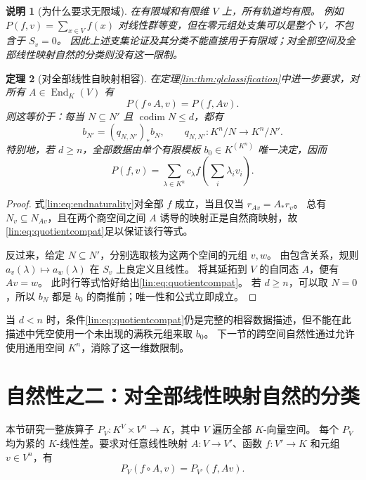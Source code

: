 \documentclass[11pt,a4paper,oneside,openany]{book}
\theoremstyle{lecture}
\newtheorem{theorem}{定理}[section]
\newtheorem{remark}[theorem]{说明}
\newcommand{\End}{\operatorname{End}}
\numberwithin{equation}{section}
\begin{document}
\begin{remark}[为什么要求无限域]
在有限域和有限维 $V$ 上，所有轨道均有限。
例如 $P(f,v)=\sum_{x\in V}f(x)$ 对线性群等变，但在零元组处支集可以是整个 $V$，不包含于 $S_v=0$。
因此上述支集论证及其分类不能直接用于有限域；对全部空间及全部线性映射自然的分类则没有这一限制。
\end{remark}

\begin{theorem}[对全部线性自映射相容]\label{lin:thm:endclassification}
在定理\ref{lin:thm:glclassification}中进一步要求，对所有 $A\in\End_K(V)$ 有
\begin{equation}\label{lin:eq:endnaturality}
 P(f\circ A,v)=P(f,Av).
\end{equation}
则这等价于：每当 $N\subseteq N'$ 且 $\operatorname{codim}N\le d$，都有
\begin{equation}\label{lin:eq:quotientcompat}
 b_{N'}=(q_{N,N'})_*b_N,
 \qquad q_{N,N'}:K^n/N\to K^n/N'.
\end{equation}
特别地，若 $d\ge n$，全部数据由单个有限模板 $b_0\in K^{(K^n)}$ 唯一决定，因而
\[
 P(f,v)=\sum_{\lambda\in K^n}c_\lambda f\left(\sum_i\lambda_iv_i\right).
\]
\end{theorem}
\begin{proof}
式\eqref{lin:eq:endnaturality}对全部 $f$ 成立，当且仅当 $r_{Av}=A_*r_v$。
总有 $N_v\subseteq N_{Av}$，且在两个商空间之间 $A$ 诱导的映射正是自然商映射，故\eqref{lin:eq:quotientcompat}足以保证该行等式。

反过来，给定 $N\subseteq N'$，分别选取核为这两个空间的元组 $v,w$。
由包含关系，规则 $a_v(\lambda)\mapsto a_w(\lambda)$ 在 $S_v$ 上良定义且线性。
将其延拓到 $V$ 的自同态 $A$，便有 $Av=w$。
此时行等式恰好给出\eqref{lin:eq:quotientcompat}。
若 $d\ge n$，可以取 $N=0$，所以 $b_N$ 都是 $b_0$ 的商推前；唯一性和公式立即成立。
\end{proof}

当 $d<n$ 时，条件\eqref{lin:eq:quotientcompat}仍是完整的相容数据描述，但不能在此描述中凭空使用一个未出现的满秩元组来取 $b_0$。
下一节的跨空间自然性通过允许使用通用空间 $K^n$，消除了这一维数限制。

\section{自然性之二：对全部线性映射自然的分类}\label{lin:sec:universal}
本节研究一整族算子 $P_V:K^V\times V^n\to K$，其中 $V$ 遍历全部 $K$-向量空间。
每个 $P_V$ 均为紧的 $K$-线性差。要求对任意线性映射 $A:V\to V'$、函数 $f:V'\to K$ 和元组 $v\in V^n$，有
\begin{equation}\label{lin:eq:functorial}
 P_V(f\circ A,v)=P_{V'}(f,Av).
\end{equation}
\end{document}
